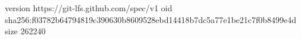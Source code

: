 version https://git-lfs.github.com/spec/v1
oid sha256:f03782b64794819c390630b8609528ebd14418b7dc5a77e1be21c7f0b8499e4d
size 262240
